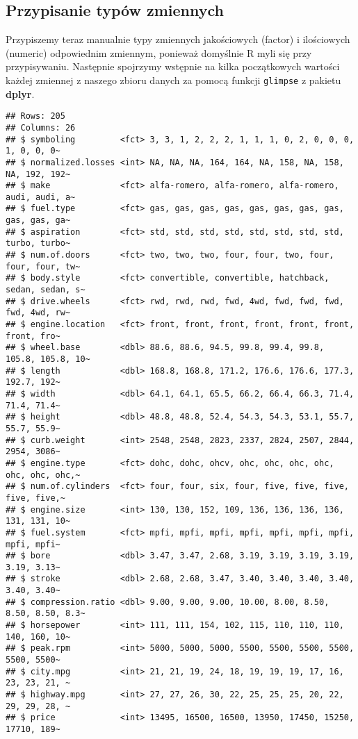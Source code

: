 \documentclass[12pt, a4paper]{article}\usepackage[]{graphicx}\usepackage[]{xcolor}
\makeatletter
\newenvironment{kframe}{%
 \def\at@end@of@kframe{}%
 \ifinner\ifhmode%
  \def\at@end@of@kframe{\end{minipage}}%
  \begin{minipage}{\columnwidth}%
 \fi\fi%
 \def\FrameCommand##1{\hskip\@totalleftmargin \hskip-\fboxsep
 \colorbox{shadecolor}{##1}\hskip-\fboxsep
     \hskip-\linewidth \hskip-\@totalleftmargin \hskip\columnwidth}%
 \MakeFramed {\advance\hsize-\width
   \@totalleftmargin\z@ \linewidth\hsize
   \@setminipage}}%
 {\par\unskip\endMakeFramed%
 \at@end@of@kframe}
\newenvironment{knitrout}{}{} %
\makeatother
\begin{document}
\subsection{Przypisanie typów zmiennych}

Przypiszemy teraz manualnie typy zmiennych jakościowych (factor) i ilościowych (numeric) odpowiednim zmiennym, ponieważ domyślnie R myli się przy przypisywaniu. Następnie spojrzymy wstępnie na kilka początkowych wartości każdej zmiennej z naszego zbioru danych za pomocą funkcji \texttt{glimpse} z pakietu \textbf{dplyr}.

\begin{knitrout}
\color{fgcolor}\begin{kframe}
\begin{verbatim}
## Rows: 205
## Columns: 26
## $ symboling         <fct> 3, 3, 1, 2, 2, 2, 1, 1, 1, 0, 2, 0, 0, 0, 1, 0, 0, 0~
## $ normalized.losses <int> NA, NA, NA, 164, 164, NA, 158, NA, 158, NA, 192, 192~
## $ make              <fct> alfa-romero, alfa-romero, alfa-romero, audi, audi, a~
## $ fuel.type         <fct> gas, gas, gas, gas, gas, gas, gas, gas, gas, gas, ga~
## $ aspiration        <fct> std, std, std, std, std, std, std, std, turbo, turbo~
## $ num.of.doors      <fct> two, two, two, four, four, two, four, four, four, tw~
## $ body.style        <fct> convertible, convertible, hatchback, sedan, sedan, s~
## $ drive.wheels      <fct> rwd, rwd, rwd, fwd, 4wd, fwd, fwd, fwd, fwd, 4wd, rw~
## $ engine.location   <fct> front, front, front, front, front, front, front, fro~
## $ wheel.base        <dbl> 88.6, 88.6, 94.5, 99.8, 99.4, 99.8, 105.8, 105.8, 10~
## $ length            <dbl> 168.8, 168.8, 171.2, 176.6, 176.6, 177.3, 192.7, 192~
## $ width             <dbl> 64.1, 64.1, 65.5, 66.2, 66.4, 66.3, 71.4, 71.4, 71.4~
## $ height            <dbl> 48.8, 48.8, 52.4, 54.3, 54.3, 53.1, 55.7, 55.7, 55.9~
## $ curb.weight       <int> 2548, 2548, 2823, 2337, 2824, 2507, 2844, 2954, 3086~
## $ engine.type       <fct> dohc, dohc, ohcv, ohc, ohc, ohc, ohc, ohc, ohc, ohc,~
## $ num.of.cylinders  <fct> four, four, six, four, five, five, five, five, five,~
## $ engine.size       <int> 130, 130, 152, 109, 136, 136, 136, 136, 131, 131, 10~
## $ fuel.system       <fct> mpfi, mpfi, mpfi, mpfi, mpfi, mpfi, mpfi, mpfi, mpfi~
## $ bore              <dbl> 3.47, 3.47, 2.68, 3.19, 3.19, 3.19, 3.19, 3.19, 3.13~
## $ stroke            <dbl> 2.68, 2.68, 3.47, 3.40, 3.40, 3.40, 3.40, 3.40, 3.40~
## $ compression.ratio <dbl> 9.00, 9.00, 9.00, 10.00, 8.00, 8.50, 8.50, 8.50, 8.3~
## $ horsepower        <int> 111, 111, 154, 102, 115, 110, 110, 110, 140, 160, 10~
## $ peak.rpm          <int> 5000, 5000, 5000, 5500, 5500, 5500, 5500, 5500, 5500~
## $ city.mpg          <int> 21, 21, 19, 24, 18, 19, 19, 19, 17, 16, 23, 23, 21, ~
## $ highway.mpg       <int> 27, 27, 26, 30, 22, 25, 25, 25, 20, 22, 29, 29, 28, ~
## $ price             <int> 13495, 16500, 16500, 13950, 17450, 15250, 17710, 189~
\end{verbatim}
\end{kframe}
\end{knitrout}
\end{document}
